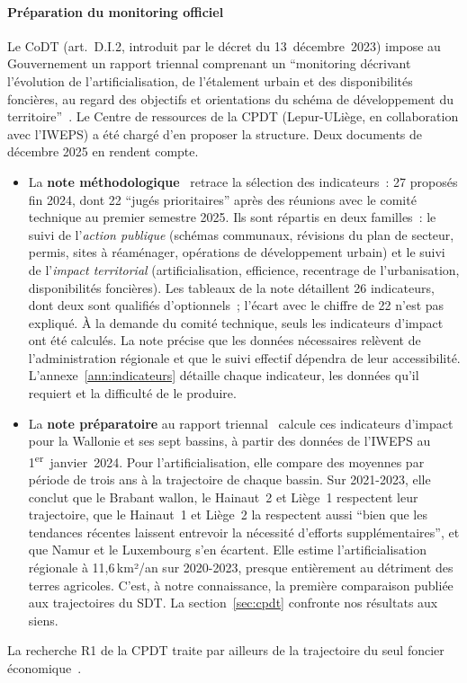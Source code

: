\documentclass[11pt,a4paper]{report}
\newcommand{\kmdan}{\,km²/an}
\begin{document}
\paragraph{Préparation du monitoring officiel} Le CoDT (art.~D.I.2, introduit par le décret du 13~décembre~2023) impose au Gouvernement un rapport triennal comprenant un \enquote{monitoring décrivant l'évolution de l'artificialisation, de l'étalement urbain et des disponibilités foncières, au regard des objectifs et orientations du schéma de développement du territoire}~\citep{codt}. Le Centre de ressources de la CPDT (Lepur-ULiège, en collaboration avec l'IWEPS) a été chargé d'en proposer la structure. Deux documents de décembre 2025 en rendent compte.
\begin{itemize}
\item La \textbf{note méthodologique}~\citep{cpdt_monitoring2025} retrace la sélection des indicateurs~: 27 proposés fin 2024, dont 22 \enquote{jugés prioritaires} après des réunions avec le comité technique au premier semestre 2025. Ils sont répartis en deux familles~: le suivi de l'\emph{action publique} (schémas communaux, révisions du plan de secteur, permis, sites à réaménager, opérations de développement urbain) et le suivi de l'\emph{impact territorial} (artificialisation, efficience, recentrage de l'urbanisation, disponibilités foncières). Les tableaux de la note détaillent 26 indicateurs, dont deux sont qualifiés d'optionnels~; l'écart avec le chiffre de 22 n'est pas expliqué. À la demande du comité technique, seuls les indicateurs d'impact ont été calculés. La note précise que les données nécessaires relèvent de l'administration régionale et que le suivi effectif dépendra de leur accessibilité. L'annexe~\ref{ann:indicateurs} détaille chaque indicateur, les données qu'il requiert et la difficulté de le produire.
\item La \textbf{note préparatoire} au rapport triennal~\citep{cpdt_prep2025} calcule ces indicateurs d'impact pour la Wallonie et ses sept bassins, à partir des données de l'IWEPS au 1\textsuperscript{er}~janvier~2024. Pour l'artificialisation, elle compare des moyennes par période de trois ans à la trajectoire de chaque bassin. Sur 2021-2023, elle conclut que le Brabant wallon, le Hainaut~2 et Liège~1 respectent leur trajectoire, que le Hainaut~1 et Liège~2 la respectent aussi \enquote{bien que les tendances récentes laissent entrevoir la nécessité d'efforts supplémentaires}, et que Namur et le Luxembourg s'en écartent. Elle estime l'artificialisation régionale à 11,6\kmdan{} sur 2020-2023, presque entièrement au détriment des terres agricoles. C'est, à notre connaissance, la première comparaison publiée aux trajectoires du SDT. La section~\ref{sec:cpdt} confronte nos résultats aux siens.
\end{itemize}
La recherche R1 de la CPDT traite par ailleurs de la trajectoire du seul foncier économique~\citep{cpdt2025}.
\end{document}
